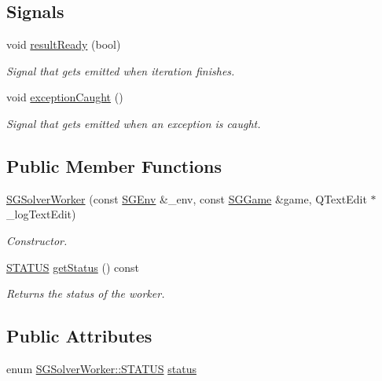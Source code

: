 \subsection*{Signals}
\begin{DoxyCompactItemize}
\item 
\mbox{\label{classSGSolverWorker_af7b2838f81e76817aca8f0d77d1082b2}} 
void \hyperlink{classSGSolverWorker_af7b2838f81e76817aca8f0d77d1082b2}{result\+Ready} (bool)
\begin{DoxyCompactList}\small\item\em Signal that gets emitted when iteration finishes. \end{DoxyCompactList}\item 
void \hyperlink{classSGSolverWorker_abf7ff15ecba6f0ec29bc26f18cd76749}{exception\+Caught} ()
\begin{DoxyCompactList}\small\item\em Signal that gets emitted when an exception is caught. \end{DoxyCompactList}\end{DoxyCompactItemize}
\subsection*{Public Member Functions}
\begin{DoxyCompactItemize}
\item 
\hyperlink{classSGSolverWorker_afafd62ccd7df1ce1fb8938248a4548da}{S\+G\+Solver\+Worker} (const \hyperlink{classSGEnv}{S\+G\+Env} \&\+\_\+env, const \hyperlink{classSGGame}{S\+G\+Game} \&game, Q\+Text\+Edit $\ast$\+\_\+log\+Text\+Edit)
\begin{DoxyCompactList}\small\item\em Constructor. \end{DoxyCompactList}\item 
\mbox{\label{classSGSolverWorker_ad1c5d3cc7098d659b32e5db5e634c554}} 
\hyperlink{classSGSolverWorker_abf12cd2fb0c6957ef6d5be6248c60abf}{S\+T\+A\+T\+US} \hyperlink{classSGSolverWorker_ad1c5d3cc7098d659b32e5db5e634c554}{get\+Status} () const
\begin{DoxyCompactList}\small\item\em Returns the status of the worker. \end{DoxyCompactList}\end{DoxyCompactItemize}
\subsection*{Public Attributes}
\begin{DoxyCompactItemize}
\item 
enum \hyperlink{classSGSolverWorker_abf12cd2fb0c6957ef6d5be6248c60abf}{S\+G\+Solver\+Worker\+::\+S\+T\+A\+T\+US} \hyperlink{classSGSolverWorker_a39528ca33a08b55076fa86e048261e1a}{status}
\end{DoxyCompactItemize}
